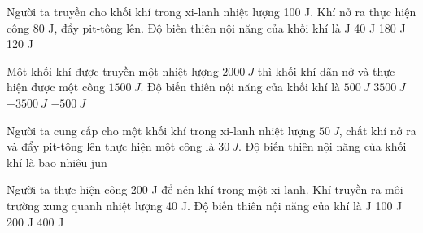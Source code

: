 \begin{ex}%
	Người ta truyền cho khối khí trong xi-lanh nhiệt lượng 100 J. Khí nở ra thực hiện công 80 J, đẩy pit-tông lên. Độ biến thiên nội năng của khối khí là
	\choice
	{ J}
	{40 J}
	{180 J}
	{120 J}
	\end{ex}



\begin{ex} 
	Một khối khí được truyền một nhiệt lượng $2000 \ J$ thì khối khí dãn nở và thực hiện được một công $1500 \ J$. Độ biến thiên nội năng của khối khí là
	\choice
	{\True $500 \ J$}
	{$3500 \ J$}
	{$-3500 \ J$}
	{$-500 \ J$}
\end{ex}


\begin{ex} 
	Người ta cung cấp cho một khối khí trong xi-lanh nhiệt lượng $50 \ J$, chất khí nở ra và đẩy pit-tông lên thực hiện một công là $30 \ J$. Độ biến thiên nội năng của khối khí là bao nhiêu jun
\end{ex}


\begin{ex}%
	Người ta thực hiện công 200 J để nén khí trong một xi-lanh. Khí truyền ra môi trường xung quanh nhiệt lượng 40 J. Độ biến thiên nội năng của khí là
	\choice
	{ J}
	{100 J}
	{200 J}
	{400 J}
	\end{ex}




